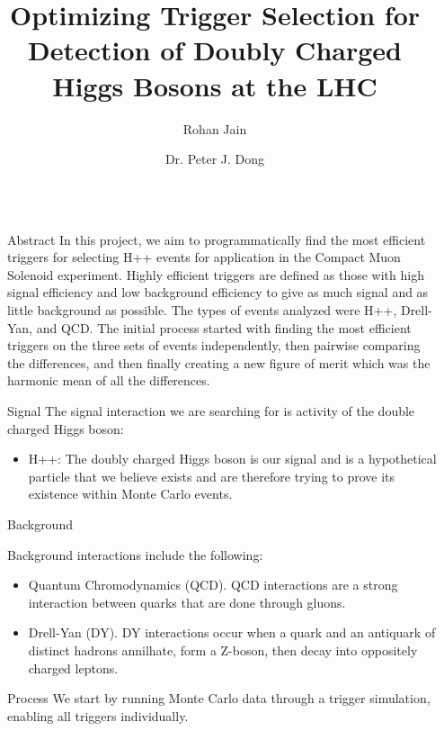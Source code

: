 \documentclass{beamer}
\title{Optimizing Trigger Selection for Detection of Doubly Charged Higgs Bosons at the LHC}
\author{Rohan Jain \and Dr. Peter J. Dong}
\institute[shortinst]{ {\texttt{rjain@imsa.edu} \samelineand  \texttt{pdong@imsa.edu} \\

Illinois Mathematics and Science Academy
}}
\newlength{\sepwidth}
\newlength{\colwidth}
\newcommand{\separatorcolumn}{\begin{column}{\sepwidth}\end{column}}
\begin{document}
\begin{frame}[t]
\begin{columns}[t]
\separatorcolumn

\begin{column}{\colwidth}
  \begin{block}{Abstract}
    In this project, we aim to programmatically find the most efficient triggers for selecting H++ events for application in the Compact Muon Solenoid experiment. Highly efficient triggers are defined as those with high signal efficiency and low background efficiency to give as much signal and as little background as possible. The types of events analyzed were H++, Drell-Yan, and QCD. The initial process started with finding the most efficient triggers on the three sets of events independently, then pairwise comparing the differences, and then finally creating a new figure of merit which was the harmonic mean of all the differences. 
  \end{block}

\begin{block}{Signal}
  The signal interaction we are searching for is activity of the double charged Higgs boson:

  \begin{itemize}
    \item H++: The doubly charged Higgs boson is our signal and is a hypothetical particle that we believe exists and are therefore trying to prove its existence within Monte Carlo events.
  \end{itemize}
\end{block}

  \begin{block}{Background}

    Background interactions include the following:

    \begin{itemize}
      \item Quantum Chromodynamics (QCD). QCD interactions are a strong interaction between quarks that are done through gluons. 
      \item Drell-Yan (DY). DY interactions occur when a quark and an antiquark of distinct hadrons annilhate, form a Z-boson, then decay into oppositely charged leptons.
    \end{itemize}
  \end{block}

  \begin{block}{Process}
    We start by running Monte Carlo data through a trigger simulation, enabling all triggers individually.


\end{block}
\end{column}
\end{columns}
\end{frame}
\end{document}

